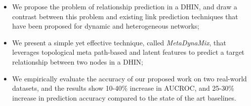 \begin{itemize}

\item We propose the problem of relationship prediction in a DHIN, and draw a contrast between this problem and existing link prediction techniques that have been proposed for dynamic and heterogeneous networks;

\item We present a simple yet effective technique, called \textit{MetaDynaMix}, that leverages topological meta path-based and latent features to predict a target relationship between two nodes in a DHIN;



\item We empirically evaluate the accuracy of our proposed work on two real-world datasets, and the results show 10-40\% increase in AUCROC, and 25-30\% increase in prediction accuracy compared to the state of the art baselines.

\end{itemize}


